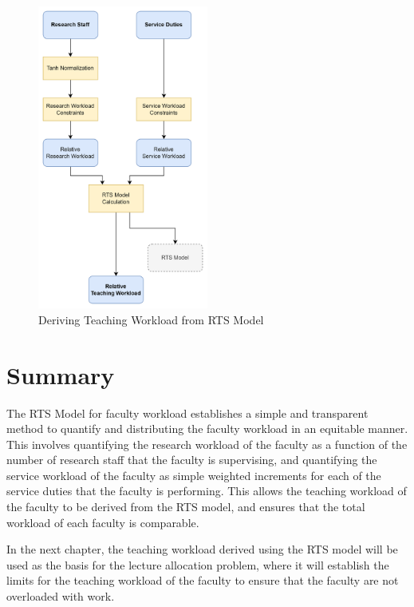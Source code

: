 \begin{figure}[H]
  \includegraphics[width=0.5\textwidth]{images/faculty_wam.png}
  \centering
  \caption{Deriving Teaching Workload from RTS Model}
  \label{fig:faculty_wam}
\end{figure}


\section{Summary}

The RTS Model for faculty workload establishes a simple and transparent method to quantify and distributing the faculty workload in an equitable manner. This involves quantifying the research workload of the faculty as a function of the number of research staff that the faculty is supervising, and quantifying the service workload of the faculty as simple weighted increments for each of the service duties that the faculty is performing. This allows the teaching workload of the faculty to be derived from the RTS model, and ensures that the total workload of each faculty is comparable.

In the next chapter, the teaching workload derived using the RTS model will be used as the basis for the lecture allocation problem, where it will establish the limits for the teaching workload of the faculty to ensure that the faculty are not overloaded with work.
